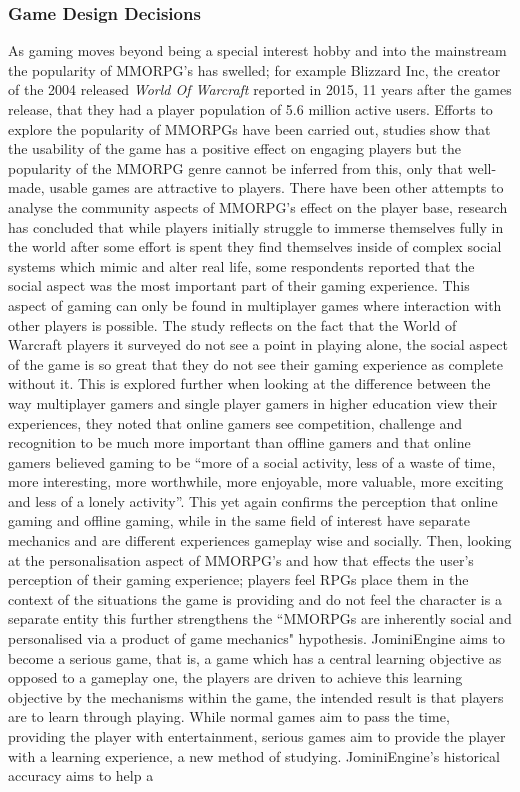 \documentclass{article}
\begin{document}
	\subsubsection{Game Design Decisions}
	As gaming moves beyond being a special interest hobby and into the mainstream the popularity of MMORPG’s has swelled; for example Blizzard Inc, the creator of the 2004 released \textit{World Of Warcraft} reported in 2015, 11 years after the games release, that they had a player population of 5.6 million active users. Efforts to explore the popularity of MMORPGs have been carried out\cite{Christou:2012:EPP:2367616.2367630}, studies show that the usability of the game has a positive effect on engaging players but the popularity of the MMORPG genre cannot be inferred from this, only that well-made, usable games are attractive to players. There have been other attempts to analyse the community aspects of MMORPG’s effect on the player base\cite{DoThoseWhoPlay}, research has concluded that while players initially struggle to immerse themselves fully in the world after some effort is spent they find themselves inside of complex social systems which mimic and alter real life, some respondents reported that the social aspect was the most important part of their gaming experience. This aspect of gaming can only be found in multiplayer games where interaction with other players is possible. The study reflects on the fact that the World of Warcraft players it surveyed do not see a point in playing alone, the social aspect of the game is so great that they do not see their gaming experience as complete without it. This is explored further when looking at the\cite{Hainey:2011:DMO:2304793.2305216} difference between the way multiplayer gamers and single player gamers in higher education view their experiences, they noted that online gamers see competition, challenge and recognition to be much more important than offline gamers and that online gamers believed gaming to be “more of a social activity, less of a waste of time, more interesting, more worthwhile, more enjoyable, more valuable, more exciting and less of a lonely activity”. This yet again confirms the perception that online gaming and offline gaming, while in the same field of interest have separate mechanics and are different experiences gameplay wise and socially. Then, looking at the personalisation aspect of MMORPG’s and how that effects the user’s perception of their gaming experience; players feel RPGs place them in the context of the situations the game is providing and do not feel the character is a separate entity\cite{bowman:2012:EPP:2367616.2367630} this further strengthens the “MMORPGs are inherently social and personalised via a product of game mechanics" hypothesis. JominiEngine aims to become a serious game, that is, a game which has a central learning objective as opposed to a gameplay one, the players are driven to achieve this learning objective by the mechanisms within the game, the intended result is that players are to learn through playing. While normal games aim to pass the time, providing the player with entertainment, serious games aim to provide the player with a learning experience, a new method of studying. JominiEngine's historical accuracy aims to help a 
\end{document}
